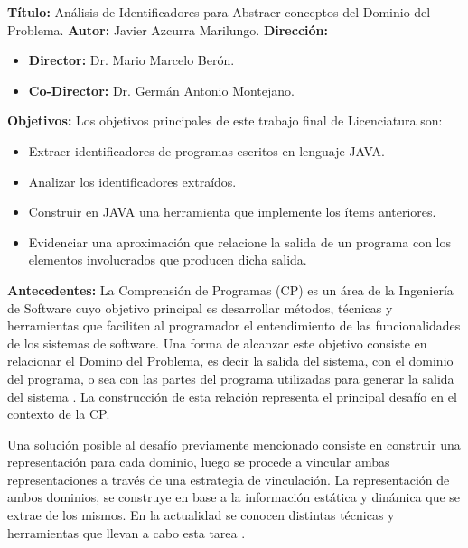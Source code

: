 \documentclass[a4paper,12pt]{report}
\begin{document}
{\large \textbf{Título:}} Análisis de Identificadores para Abstraer conceptos del Dominio del Problema.
\vskip0.5cm
{\large \textbf{Autor:}} Javier Azcurra Marilungo.
\vskip0.5cm
{\large \textbf{Dirección:}}
\begin{itemize}
\itemsep0em%
\item \textbf{Director:} Dr. Mario Marcelo Berón.

\item \textbf{Co-Director:} Dr. Germán Antonio Montejano.
\end{itemize}

{\large \textbf{Objetivos:}} Los objetivos principales de este trabajo final de Licenciatura son:
\begin{itemize}
\itemsep0em%
\item Extraer identificadores de programas escritos en lenguaje JAVA.

\item Analizar los identificadores extraídos.

\item Construir en JAVA una herramienta que implemente los ítems anteriores.

\item Evidenciar una aproximación que relacione la salida de un programa con los elementos involucrados que producen dicha salida.
\end{itemize}

{\large \textbf{Antecedentes:}}
\vskip0.5cm
\hspace{0.5cm} La Comprensión de Programas (CP) \cite{BRM10,MPMR07,MBPHRU10,MAS05} es un área de la Ingeniería de Software cuyo objetivo 
principal es desa\-rrollar métodos, técnicas y herramientas que faciliten al programador 
el entendimiento de las funcionalidades de los sistemas de software.
Una forma de alcanzar este objetivo consiste en relacionar el Domino del Problema, 
es decir la salida del sistema, con el dominio del programa, o sea 
con las partes del programa utilizadas para generar la salida del sistema \cite{VMAVA95,MPOB03,BROOK82}.
La construcción de esta relación representa el principal desafío en el contexto de la 
CP. 

\hspace{0.5cm}Una solución posible al desafío previamente mencionado consiste en construir 
una representación para cada dominio, luego se procede a vincular ambas representaciones a través de una estrategia de vinculación.
La representación de ambos dominios, se construye en base a la información 
estática y dinámica que se extrae de los mismos. En la actualidad se conocen distintas técnicas y herramientas que llevan a cabo esta tarea \cite{AHUL06,THBE99}.
 
\end{document}
